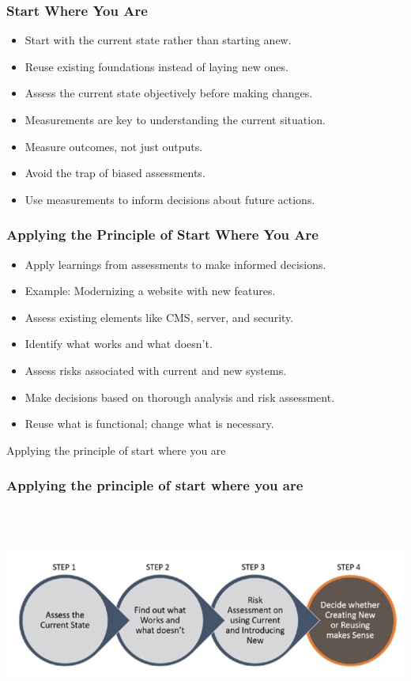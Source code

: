 \documentclass[aspectratio=169, table]{beamer}
\begin{document}
\begin{frame}
	\frametitle{Start Where You Are}
	\begin{itemize}
		\item Start with the current state rather than starting anew.
		\item Reuse existing foundations instead of laying new ones.
		\item Assess the current state objectively before making changes.
		\item Measurements are key to understanding the current situation.
		\item Measure outcomes, not just outputs.
		\item Avoid the trap of biased assessments.
		\item Use measurements to inform decisions about future actions.
	\end{itemize}
\end{frame}

\begin{frame}
	\frametitle{Applying the Principle of Start Where You Are}
	\begin{itemize}
		\item Apply learnings from assessments to make informed decisions.
		\item Example: Modernizing a website with new features.
		\item Assess existing elements like CMS, server, and security.
		\item Identify what works and what doesn’t.
		\item Assess risks associated with current and new systems.
		\item Make decisions based on thorough analysis and risk assessment.
		\item Reuse what is functional; change what is necessary.
	\end{itemize}
\end{frame}

\begin{frame}{Applying the principle of start where you are} 	 \frametitle{ Applying the principle of start where you are} \begin{center} 	\includegraphics[width=0.8\linewidth]{images/image-01.png} \end{center} \end{frame}
\end{document}
